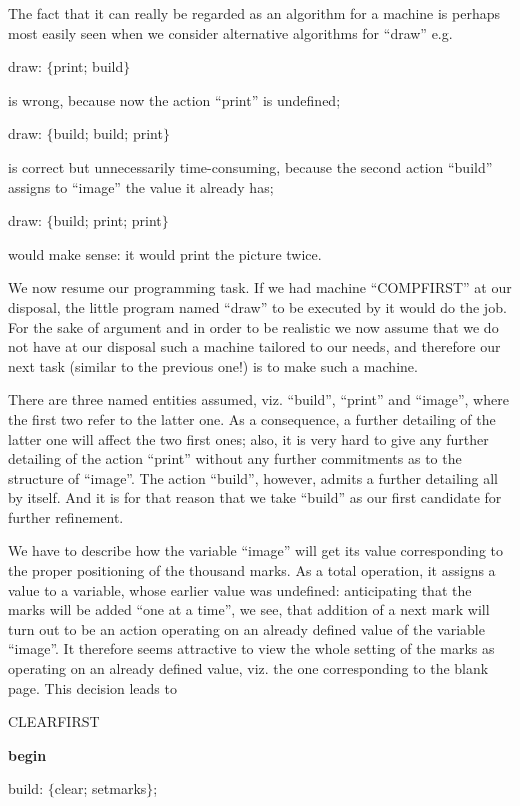 The fact that it can really be regarded as an algorithm for a machine is perhaps most easily seen when we consider alternative algorithms for ``draw'' e.g.

draw: $\{$print; build$\}$

\noindent
is wrong, because now the action ``print'' is undefined;

draw: $\{$build; build; print$\}$

\noindent
is correct but unnecessarily time-consuming, because the second action ``build'' assigns to ``image'' the value it already has;

draw: $\{$build; print; print$\}$

\noindent
would make sense: it would print the picture twice.

We now resume our programming task. If we had machine ``COMPFIRST'' at our disposal, the little program named ``draw'' to be executed by it would do the job. For the sake of argument and in order to be realistic we now assume that we do not have at our disposal such a machine tailored to our needs, and therefore our next task (similar to the previous one!) is to make such a machine.

There are three named entities assumed, viz. ``build'', ``print'' and ``image'', where the first two refer to the latter one. As a consequence, a further detailing of the latter one will affect the two first ones; also, it is very hard to give any further detailing of the action ``print'' without any further commitments as to the structure of ``image''. The action ``build'', however, admits a further detailing all by itself. And it is for that reason that we take ``build'' as our first candidate for further refinement.

We have to describe how the variable ``image'' will get its value corresponding to the proper positioning of the thousand marks. As a total operation, it assigns a value to a variable, whose earlier value was undefined: anticipating that the marks will be added ``one at a time'', we see, that addition of a next mark will turn out to be an action operating on an already defined value of the variable ``image''. It therefore seems attractive to view the whole setting of the marks as operating on an already defined value, viz. the one corresponding to the blank page. This decision leads to

CLEARFIRST

\textbf{begin}

\quad build: $\{$clear; setmarks$\}$;

